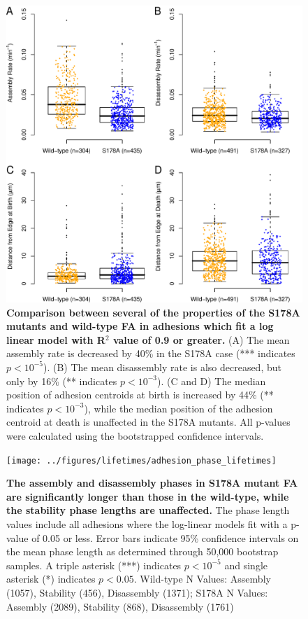 \begin{figure}[htbp]
\begin{center}
\includegraphics[width=\textwidth]{../figures/S178A/S178A_vs_wild-type}
\end{center}
\caption{
{\bf Comparison between several of the properties of the S178A mutants and
wild-type FA in adhesions which fit a log linear model with R$^2$ value of 0.9
or greater.} (A) The mean assembly rate is decreased by 40\% in the S178A case
(*** indicates $p<10^{-5}$). (B) The mean disassembly rate is also decreased,
but only by 16\% (** indicates $p<10^{-3}$). (C and D) The median position of
adhesion centroids at birth is increased by 44\% (** indicates $p<10^{-3}$),
while the median position of the adhesion centroid at death is unaffected in the
S178A mutants. All p-values were calculated using the bootstrapped
confidence intervals.  }
\label{S178A}
\end{figure}

\begin{figure}[htbp]
\begin{center}
\texttt{[image: ../figures/lifetimes/adhesion\_phase\_lifetimes]}
\end{center}
\caption{
{\bf The assembly and disassembly phases in S178A mutant FA are significantly
longer than those in the wild-type, while the stability phase lengths are
unaffected.} The phase length values include all adhesions where the log-linear
models fit with a p-value of 0.05 or less.  Error bars indicate 95\% confidence
intervals on the mean phase length as determined through 50,000 bootstrap
samples. A triple asterisk (***) indicates $p<10^{-5}$ and single asterisk (*)
indicates $p<0.05$. Wild-type N Values: Assembly (1057), Stability (456),
Disassembly (1371); S178A N Values: Assembly (2089), Stability (868),
Disassembly (1761)
}
\label{lifetimes}
\end{figure}

